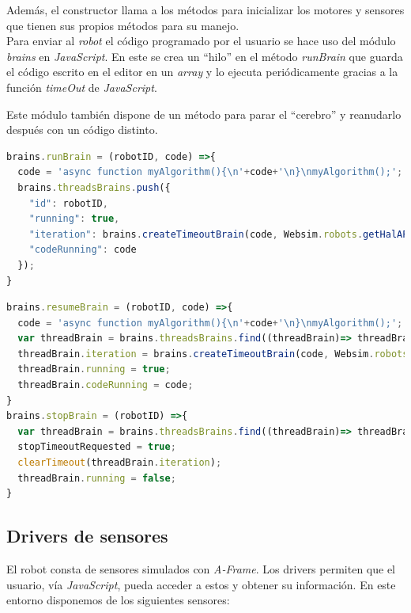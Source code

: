 Además, el constructor llama a los métodos para inicializar los motores y sensores que tienen sus propios métodos para su manejo. \\

Para enviar al \textit{robot} el código programado por el usuario se hace uso del módulo \textit{brains} en \textit{JavaScript}. En este se crea un ``hilo'' en el método \textit{runBrain} que guarda el código escrito en el editor en un \textit{array} y lo ejecuta periódicamente gracias a la función \textit{timeOut} de \textit{JavaScript}.

Este módulo también dispone de un método para parar el ``cerebro'' y reanudarlo después con un código distinto.
\begin{lstlisting}[language=javascript, caption=Método \textit{runBrain} para ejecutar el código del usuario]
brains.runBrain = (robotID, code) =>{
  code = 'async function myAlgorithm(){\n'+code+'\n}\nmyAlgorithm();';
  brains.threadsBrains.push({
    "id": robotID,
    "running": true,
    "iteration": brains.createTimeoutBrain(code, Websim.robots.getHalAPI(robotID), robotID),
    "codeRunning": code
  });
}
\end{lstlisting}

\begin{lstlisting}[language=javascript, caption=Métodos \textit{resumeBrain} y \textit{stopBrain} para parar/reanudar el cerebro del robot]
brains.resumeBrain = (robotID, code) =>{
  code = 'async function myAlgorithm(){\n'+code+'\n}\nmyAlgorithm();';
  var threadBrain = brains.threadsBrains.find((threadBrain)=> threadBrain.id == robotID);
  threadBrain.iteration = brains.createTimeoutBrain(code, Websim.robots.getHalAPI(robotID), robotID);
  threadBrain.running = true;
  threadBrain.codeRunning = code;
}
brains.stopBrain = (robotID) =>{
  var threadBrain = brains.threadsBrains.find((threadBrain)=> threadBrain.id == robotID);
  stopTimeoutRequested = true;
  clearTimeout(threadBrain.iteration);
  threadBrain.running = false;
}
\end{lstlisting}



\subsection{Drivers de sensores}
\label{subsec:driversSensores}
El robot consta de sensores simulados con \textit{A-Frame}. Los drivers permiten que el usuario, vía \textit{JavaScript}, pueda acceder a estos y obtener su información. En este entorno disponemos de los siguientes sensores: 

